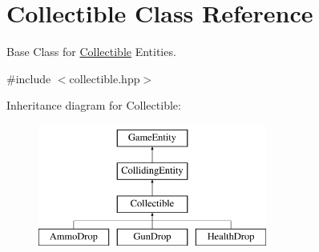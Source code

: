 \hypertarget{class_collectible}{}\section{Collectible Class Reference}
\label{class_collectible}


Base Class for \mbox{\hyperlink{class_collectible}{Collectible}} Entities.  




{\ttfamily \#include $<$collectible.\+hpp$>$}

Inheritance diagram for Collectible\+:\begin{figure}[H]
\begin{center}
\leavevmode
\includegraphics[height=4.000000cm]{class_collectible}
\end{center}
\end{figure}
